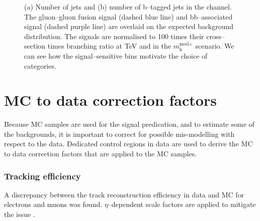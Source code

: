 \begin{figure}[h!]
\begin{center}
\end{center}
\caption{(a) Number of jets and (b) number of b--tagged jets in the \mutau channel. The gluon--gluon fusion signal (dashed
blue line) and bb--associated signal (dashed purple line) are overlaid on the expected background distribution. The signals
are normalised to 100 times their cross--section times branching ratio at  TeV and  in the $m_{\text{h}}^{\text{mod+}}$
scenario. We can see how the signal--sensitive bins motivate the choice of categories.}
\label{fig:mssm_cats_mt}
\end{figure}


\section{\ac{MC} to data correction factors}
\label{sec:mssm_mccorrs}
Because \ac{MC} samples are used for the signal predication, and 
to estimate some of the backgrounds, it is important to correct for possible 
mis-modelling with respect to the data. Dedicated control regions in
data are used to derive the \ac{MC} to data correction factors
that are applied to the \ac{MC} samples.
\subsubsection*{Tracking efficiency}
A discrepancy between the track reconstruction efficiency
in data and \ac{MC} for electrons and muons was found. $\eta$--dependent
scale factors are applied to mitigate the issue \cite{CMS-PAS-HIG-16-037}.
